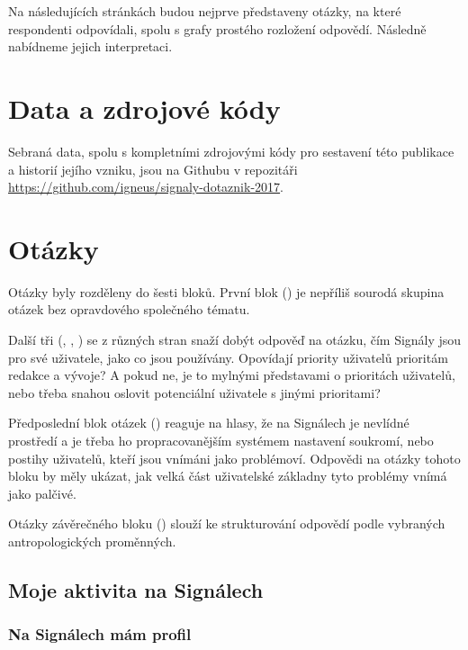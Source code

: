 \documentclass[12pt, a4paper, twoside]{article}
\begin{document}
Na následujících stránkách budou nejprve představeny otázky,
na které respondenti odpovídali, spolu s grafy prostého
rozložení odpovědí. Následně nabídneme jejich interpretaci.

\section{Data a zdrojové kódy}

Sebraná data, spolu s kompletními zdrojovými kódy pro sestavení
této publikace a historií jejího vzniku,
jsou na Githubu v repozitáři\\
\url{https://github.com/igneus/signaly-dotaznik-2017}.

\section{Otázky}

Otázky byly rozděleny do šesti bloků.
První blok ()
je nepříliš sourodá skupina otázek bez opravdového společného tématu.

Další tři
(, , )
se z různých stran snaží dobýt odpověď na otázku, čím Signály jsou
pro své uživatele, jako co jsou používány.
Opovídají priority uživatelů prioritám redakce a vývoje?
A pokud ne, je to mylnými představami o prioritách uživatelů,
nebo třeba snahou oslovit potenciální uživatele s jinými prioritami?

Předposlední blok otázek ()
reaguje na hlasy, že na Signálech je nevlídné prostředí
a je třeba ho  propracovanějším systémem nastavení
soukromí, nebo postihy uživatelů, kteří jsou vnímáni jako problémoví.
Odpovědi na otázky tohoto bloku by měly ukázat, jak velká část
uživatelské základny tyto problémy vnímá jako palčivé.

Otázky závěrečného bloku ()
slouží ke strukturování odpovědí
podle vybraných antropologických proměnných.

\vfill

\subsection{Moje aktivita na Signálech}\label{sec:mojeaktivita}

\subsubsection{Na Signálech mám profil}
\end{document}
